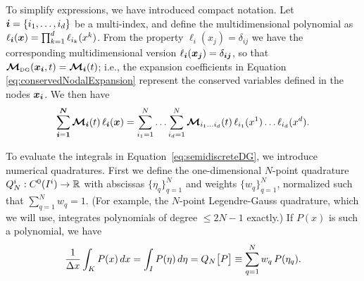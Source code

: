 \documentclass[10pt,preprint]{aastex}
\begin{document}
To simplify expressions, we have introduced compact notation.  
Let $\boldsymbol{i}=\{i_{1},\ldots,i_{d}\}$ be a multi-index, and define the multidimensional polynomial as $\ell_{\boldsymbol{i}}(\boldsymbol{x})=\prod_{k=1}^{d}\ell_{i_{k}}(x^{k})$.  
From the property $\ell_{i}(x_{j})=\delta_{ij}$ we have the corresponding multidimensional version $\ell_{\boldsymbol{i}}(\boldsymbol{x}_{\boldsymbol{j}})=\delta_{\boldsymbol{i}\boldsymbol{j}}$, so that $\boldsymbol{\mathcal{M}}_{\mbox{\tiny DG}}(\boldsymbol{x}_{\boldsymbol{i}},t)=\boldsymbol{\mathcal{M}}_{\boldsymbol{i}}(t)$; i.e., the expansion coefficients in Equation \eqref{eq:conservedNodalExpansion} represent the conserved variables defined in the nodes $\boldsymbol{x}_{\boldsymbol{i}}$.  
We then have
\begin{equation}
  \sum_{\boldsymbol{i}=\boldsymbol{1}}^{\boldsymbol{N}}\boldsymbol{\mathcal{M}}_{\boldsymbol{i}}(t)\,\ell_{\boldsymbol{i}}(\boldsymbol{x})
  =\sum_{i_{1}=1}^{N}\ldots\sum_{i_{d}=1}^{N}\boldsymbol{\mathcal{M}}_{i_{1}\ldots i_{d}}(t)\,\ell_{i_{1}}(x^{1})\ldots\ell_{i_{d}}(x^{d}).  
\end{equation}

To evaluate the integrals in Equation~\eqref{eq:semidiscreteDG}, we introduce numerical quadratures.  
First we define the one-dimensional $N$-point quadrature $Q_{N}^{i}:C^{0}(I^{i})\to\mathbb{R}$ with abscissas $\{\eta_{q}\}_{q=1}^{N}$ and weights $\{w_{q}\}_{q=1}^{N}$, normalized such that $\sum_{q=1}^{N}w_{q}=1$.  
(For example, the $N$-point Legendre-Gauss quadrature, which we will use, integrates polynomials of degree $\le 2N-1$ exactly.)
If $P(x)$ is such a polynomial, we have
\begin{equation}
  \frac{1}{\Delta x}\int_{K}P(x)\,dx=\int_{I}P(\eta)\,d\eta=Q_{N}\big[P\big]\equiv\sum_{q=1}^{N}w_{q}\,P(\eta_{q}).  
\end{equation}
\end{document}

